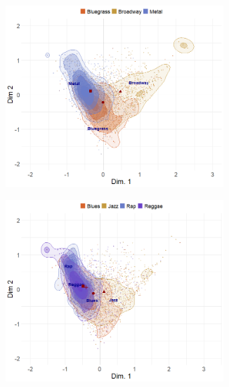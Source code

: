 \documentclass[12pt]{article}
\begin{document}
\begin{figure}[t]
     \begin{subfigure}[b]{0.49\textwidth}
        \includegraphics[trim={0cm 0cm 0cm 0cm},clip, width=0.9\textwidth]{Plots/genre-proto-ex3.png}
            \caption{}
            \label{fig:genre-fuzz-c}
    \end{subfigure}
     \begin{subfigure}[b]{0.49\textwidth}
        \includegraphics[trim={0cm 0cm 0cm 0cm},clip, width=0.9\textwidth]{Plots/genre-proto-ex4.png}
            \caption{}
            \label{fig:genre-fuzz-d}
    \end{subfigure}
     \begin{subfigure}[b]{0.49\textwidth}

\end{subfigure}
\end{figure}
\end{document}
